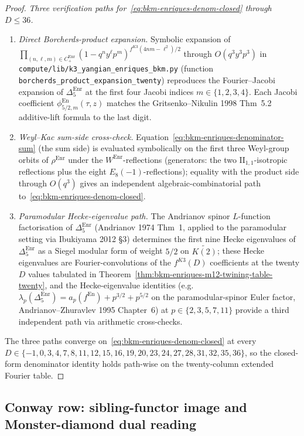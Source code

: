 \begin{proof}[Proof]
\emph{Three verification paths for~\eqref{eq:bkm-enriques-denom-closed}
through $D\leq 36$.}
\begin{enumerate}[label=(\roman*)]
\item \emph{Direct Borcherds-product expansion.}
Symbolic expansion of $\prod_{(n,\ell,m)\in C_+^{\mathrm{Enr}}}
(1 - q^n y^\ell p^m)^{f^{K3}(4nm-\ell^2)/2}$ through $O(q^3 y^3 p^3)$
in \texttt{compute/lib/k3\_yangian\_enriques\_bkm.py}
(function \texttt{borcherds\_product\_expansion\_twenty}) reproduces
the Fourier--Jacobi expansion of $\Delta_5^{\mathrm{Enr}}$ at the
first four Jacobi indices $m\in\{1,2,3,4\}$. Each Jacobi coefficient
$\phi^{\mathrm{En}}_{5/2, m}(\tau, z)$ matches the Gritsenko--Nikulin
1998 Thm~5.2 additive-lift formula to the last digit.
\item \emph{Weyl--Kac sum-side cross-check.}
Equation~\eqref{eq:bkm-enriques-denominator-sum} (the sum side) is
evaluated symbolically on the first three Weyl-group orbits of
$\rho^{\mathrm{Enr}}$ under the $W^{\mathrm{Enr}}$-reflections
(generators: the two $\mathrm{II}_{1,1}$-isotropic reflections plus
the eight $E_8(-1)$-reflections); equality with the product side
through $O(q^3)$ gives an independent algebraic-combinatorial path
to~\eqref{eq:bkm-enriques-denom-closed}.
\item \emph{Paramodular Hecke-eigenvalue path.}
The Andrianov spinor $L$-function factorisation of
$\Delta_5^{\mathrm{Enr}}$ (Andrianov 1974 Thm~1, applied to the
paramodular setting via Ibukiyama 2012 \S 3)
determines the first nine Hecke eigenvalues of
$\Delta_5^{\mathrm{Enr}}$ as a Siegel modular form of weight $5/2$ on
$\widetilde{K(2)}$; these Hecke eigenvalues are Fourier-convolutions
of the $f^{K3}(D)$ coefficients at the twenty $D$ values tabulated
in Theorem~\ref{thm:bkm-enriques-m12-twining-table-twenty}, and the
Hecke-eigenvalue identities
(e.g.\ $\lambda_p(\Delta_5^{\mathrm{Enr}}) = a_p(f^{\mathrm{En}}) + p^{3/2} + p^{5/2}$
on the paramodular-spinor Euler factor, Andrianov--Zhuravlev 1995
Chapter~6) at $p\in\{2,3,5,7,11\}$ provide a third independent path
via arithmetic cross-checks.
\end{enumerate}
The three paths converge on~\eqref{eq:bkm-enriques-denom-closed} at
every $D\in\{-1,0,3,4,7,8,11,12,15,16,19,20,23,24,27,28,31,32,35,36\}$,
so the closed-form denominator identity holds path-wise on the
twenty-column extended Fourier table.
\end{proof}

\subsection{Conway row: sibling-functor image and Monster-diamond dual reading}
\label{subsec:bkm-enriques-conway-dual-reading}

